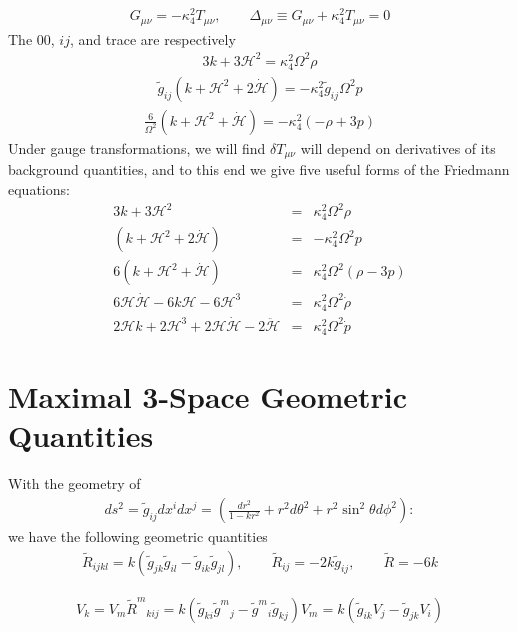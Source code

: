 \documentclass[10pt,letterpaper]{article}
\numberwithin{equation}{section}
\begin{document}
\begin{appendices}
\begin{eqnarray}
G_{\mu\nu} = -\kappa^2_4 T_{\mu\nu},\qquad \Delta_{\mu\nu} \equiv G_{\mu\nu} + \kappa_4^2 T_{\mu\nu}=0
\end{eqnarray}
The $00$, $ij$, and trace are respectively
\begin{eqnarray}
3k+3\mathcal H^2= \kappa^2_4 \Omega^2\rho
\end{eqnarray}
\begin{eqnarray}
\tilde g_{ij}(k+\mathcal H^2 + 2\dot{\mathcal H}) = -\kappa_4^2 \tilde g_{ij} \Omega^2 p 
\end{eqnarray}
\begin{eqnarray}
\frac{6}{\Omega^2}(k+\mathcal H^2 + \dot{\mathcal H}) = -\kappa_4^2 (-\rho+3p)
\end{eqnarray}
Under gauge transformations, we will find $\delta T_{\mu\nu}$ will depend on derivatives of its background quantities, and to this end we give five useful forms of the Friedmann equations:
\begin{eqnarray}
3k+3\mathcal H^2&=& \kappa^2_4 \Omega^2\rho
\nonumber\\
(k+\mathcal H^2 + 2\dot{\mathcal H}) &=& -\kappa_4^2 \Omega^2 p 
\nonumber\\
6(k+\mathcal H^2 + \dot{\mathcal H}) &=& \kappa_4^2 \Omega^2 (\rho - 3p)
\nonumber\\
6\mathcal H \dot{\mathcal H} - 6k\mathcal H - 6\mathcal H^3 &=& \kappa_4^2 \Omega^2 \dot\rho
\nonumber\\
 2\mathcal H k + 2\mathcal{H}^3+2\mathcal H \dot{\mathcal H} - 2\ddot{\mathcal H}&=& \kappa_4^2 \Omega^2 \dot p
\end{eqnarray}

\section{Maximal 3-Space Geometric Quantities}
With the geometry of
\begin{eqnarray}
ds^2 = \tilde g_{ij}dx^idx^j = \left( \frac{dr^2}{1-kr^2} + r^2 d\theta^2 + r^2\sin^2\theta d\phi^2\right):
\end{eqnarray}
we have the following geometric quantities
\begin{eqnarray}
\tilde R_{ijkl} = k(\tilde g_{jk}\tilde g_{il}-\tilde g_{ik}\tilde g_{jl}),\qquad \tilde R_{ij} = -2k\tilde g_{ij},\qquad \tilde R = -6k
\end{eqnarray}

\begin{eqnarray}
[\tilde\nabla_i,\tilde\nabla_j]V_k = V_m \tilde R^m{}_{kij}= k (\tilde g_{ki}\tilde g^{m}{}_j - \tilde g^m{}_{i}\tilde g_{kj})V_m = k(\tilde g_{ik}V_j - \tilde g_{jk}V_i)
\label{covcom}
\end{eqnarray}


\end{appendices}
\end{document}
